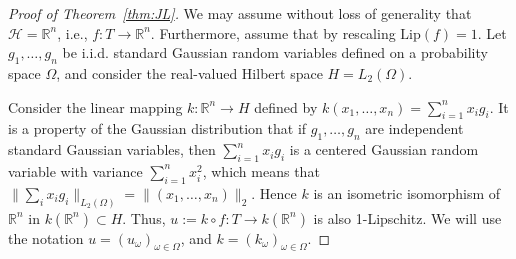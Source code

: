 \documentclass{amsart}
\newcommand{\Lip}{\mathrm{Lip}}
\newcommand{\R}{\mathbb R}
\begin{document}
\begin{proof}[Proof of Theorem~\ref{thm:JL}]
    We may assume without loss of generality that $\mathcal H=\R^n$, i.e.,
    $f:T\to \R^n$.  Furthermore, assume that by rescaling $\Lip(f)=1$. 
    Let $g_1,\ldots, g_n$ be i.i.d. standard Gaussian random variables defined on a probability space $\Omega$, and consider the real-valued Hilbert space 
    $H=L_2(\Omega)$.

    Consider the linear mapping $k:\R^n \to H$ defined by
    \( k(x_1,\ldots,x_n)= \sum_{i=1}^n x_i g_i.
    \)
It is a property of the Gaussian distribution that if $g_1,\ldots,g_n$ are independent standard Gaussian variables, then $\sum_{i=1}^n x_ig_i$ is a centered Gaussian random variable with variance $\sum_{i=1}^nx_i^2$, which means that
$\|\sum_i x_i g_i\|_{L_2(\Omega)}=\|(x_1,\ldots,x_n)\|_2$.
Hence $k$ is an isometric
    isomorphism of $\R^n$ in $k(\R^n) \subset H$.
    Thus, $u:=k\circ f:T \to k(\R^n)$ is also 1-Lipschitz.
    We will use the notation $u=(u_\omega)_{\omega\in \Omega}$, and $k=(k_\omega)_{\omega\in\Omega}$.
    

\end{proof}
\end{document}
